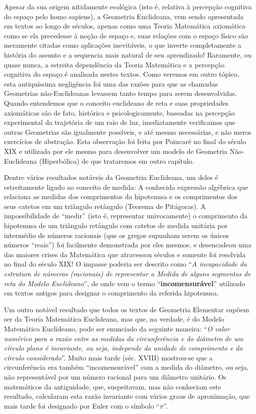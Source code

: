     Apesar da sua origem nitidamente ecológica (isto é, relativa à percepção cognitiva do espaço pelo homo sapiens), a Geometria Euclideana, vem sendo apresentada em textos ao longo de séculos, apenas como uma Teoria Matemática axiomática como se ela precedesse à noção de espaço e, suas relações com o espaço físico são meramente citadas como aplicações inevitáveis, o que inverte completamente a história do assunto e a sequencia mais natural de seu aprendizado! Raramente, ou quase nunca, a estreita dependência da Teoria Matemática e a percepção cognitiva do espaço é analisada nestes textos. Como veremos em outro tópico, esta antiquíssima negligência foi uma das razões para que as chamadas Geometrias não-Euclideanas levassem tanto tempo para serem desenvolvidas. Quando entendemos que o conceito euclideano de reta e suas propriedades axiomáticas são de fato, histórica e psicologicamente, baseadas na percepção experimental da trajetória de um raio de luz, imediatamente verificamos que outras Geometrias são igualmente possíveis, e até mesmo necessárias, e não meros exercícios de abstração. Esta observação foi feita por Poincaré no final do século XIX e utilizada por ele mesmo para desenvolver um modelo de Geometria Não-Euclideana (Hiperbólica) de que trataremos em outro capítulo.

    Dentre vários resultados notáveis da Geometria Euclideana, um deles é estreitamente ligado ao conceito de medida: A conhecida expressão algébrica que relaciona as medidas dos comprimentos da hipotenusa e os comprimentos dos seus catetos em um triângulo retângulo (Teorema de Pitágoras). A impossibilidade de ``medir'' (isto é, representar univocamente) o comprimento da hipotenusa de um triângulo retângulo com catetos de medida unitária por intermédio de números racionais (que os gregos supunham serem os únicos números ``reais'') foi facilmente demonstrada por eles mesmos, e desencadeou uma das maiores crises da Matemática que atravessou séculos e somente foi resolvida no final do século XIX! O impasse poderia ser descrito como ``\textit{A incapacidade da estrutura de números (racionais) de representar a Medida de alguns segmentos de reta do Modelo Euclideano}'', de onde vem o termo ``\textbf{incomensurável}'' utilizado em textos antigos para designar o comprimento da referida hipotenusa.

    Um outro notável resultado que todos os textos de Geometria Elementar supõem ser da Teoria Matemática Euclideana, mas que, na verdade, é do Modelo Matemático Euclideano, pode ser enunciado da seguinte maneira: ``\textit{O valor numérico para a razão entre as medidas da circunferência e do diâmetro de um círculo plano é invariante, ou seja, independe da unidade de comprimento e do círculo considerado}''. Muito mais tarde (séc. XVIII) mostrou-se que a circunferência era também ``incomensurável'' com a medida do diâmetro, ou seja, não representável por um número racional para um diâmetro unitário. Os matemáticos da antiguidade, que, suspeitavam, mas não conheciam este resultado, calcularam esta razão invariante com vários graus de aproximação, que mais tarde foi designado por Euler com o símbolo ``\(\pi\)''.

